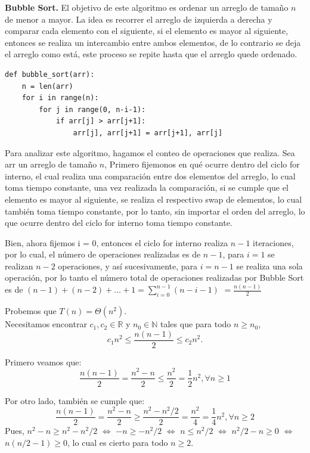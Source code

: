 \documentclass[
 12pt,
 letterpaper,
]{article}
\theoremstyle{teoremaBreak}
\theoremstyle{plain}
\theoremstyle{definition}
\begin{document}
\textbf{Bubble Sort.}
El objetivo de este algoritmo es ordenar un arreglo de tamaño $n$ de menor a mayor. La idea es 
recorrer el arreglo de izquierda a derecha y comparar cada elemento con el siguiente, si el elemento 
es mayor al siguiente, entonces se realiza un intercambio entre ambos elementos, de lo contrario 
se deja el arreglo como está, este proceso se repite hasta que el arreglo quede ordenado.\\
\begin{lstlisting}[style=pseudocodigo]
def bubble_sort(arr):
    n = len(arr)
    for i in range(n):
        for j in range(0, n-i-1):
            if arr[j] > arr[j+1]:
                arr[j], arr[j+1] = arr[j+1], arr[j]
\end{lstlisting}

Para analizar este algoritmo, hagamos el conteo de operaciones que realiza. Sea arr un arreglo de tamaño $n$, 
Primero fijemonos en qué ocurre dentro del ciclo for interno, el cual realiza una comparación entre dos 
elementos del arreglo, lo cual toma tiempo constante, una vez realizada la comparación, si se cumple que 
el elemento es mayor al siguiente, se realiza el respectivo swap de elementos, lo cual también toma tiempo 
constante, por lo tanto, sin importar el orden del arreglo, lo que ocurre dentro del ciclo for interno 
toma tiempo constante.

Bien, ahora fijemos i = 0, entonces el ciclo for interno realiza $n - 1$ iteraciones, por lo cual, 
el número de operaciones realizadas es de $n - 1$, para $i = 1$ se realizan $n - 2$ operaciones, y así 
sucesivamente, para $i = n - 1$ se realiza una sola operación, por lo tanto el número total de 
operaciones realizadas por Bubble Sort es de $(n - 1) + (n - 2) + \dots + 1 = \sum_{i=0}^{n-1} (n-i-1)$ 
$ = \frac{n(n-1)}{2}$

Probemos que $T(n) = \Theta(n^2)$.\\
Necesitamos encontrar $c_1, c_2 \in \mathbb{R}$ y $n_0 \in \mathbb{N}$ tales que para todo $n \geq n_0$,
$$c_1 n^2 \leq \frac{n(n-1)}{2} \leq c_2 n^2.$$

Primero veamos que: 
$$\frac{n(n-1)}{2} = \frac{n^2 - n}{2} \leq \frac{n^2}{2} = \frac{1}{2} n^2,  \forall n \geq 1$$

Por otro lado, también se cumple que:
$$\frac{n(n-1)}{2} = \frac{n^2 - n}{2} \geq \frac{n^2 - n^2/2}{2} = \frac{n^2}{4} = \frac{1}{4} n^2,  \forall n \geq 2$$
Pues, $n^2 - n \geq n^2 - n^2/2$ $\Leftrightarrow$ $-n \geq -n^2/2$ $\Leftrightarrow$ $n \leq n^2/2$ $\Leftrightarrow$ $n^2/2 - n \geq 0$ $\Leftrightarrow$ $n(n/2 - 1) \geq 0$, lo cual es cierto para todo $n \geq 2$.
\end{document}
